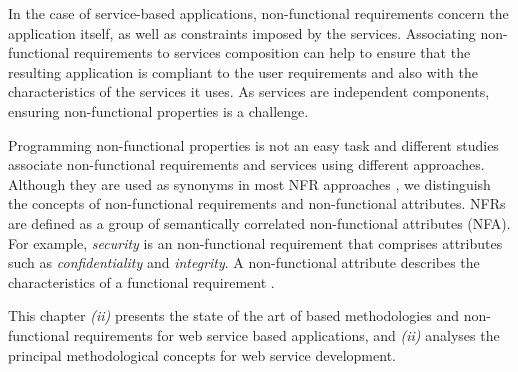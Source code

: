 


In the case of service-based applications, non-functional requirements concern
the application itself, as well as constraints imposed by the services. 
Associating non-functional requirements to services composition can help to
ensure that the resulting application is compliant to the user requirements and
also with the characteristics of the services it uses. As services are
independent components, ensuring non-functional properties is a challenge.   

  
%  
 Programming non-functional properties is not an easy task and different studies
\cite{Babamir2010,AgarwalLS09,CholletL09,GutierrezRF10,XiaoCZBOLH08,JeongCL09,Tsadimas:2012,Mairiza:2010}
 associate non-functional requirements and services using
different approaches. Although they are used as synonyms in most NFR approaches
\cite{Mairiza:2010}, we distinguish the concepts of non-functional requirements and non-functional attributes.
 NFRs are defined as a group of semantically correlated
 non-functional attributes (NFA). For example, \textit{security} is an
 non-functional requirement that comprises attributes such as
 \textit{confidentiality} and \textit{integrity}. A non-functional
 attribute describes the characteristics of a functional requirement
 .
 
 This chapter  \textit{(ii)} presents the state of the art of  based methodologies and non-functional requirements for web service
 based applications, and \textit{(ii)} analyses the principal methodological
 concepts for web service development.
 

